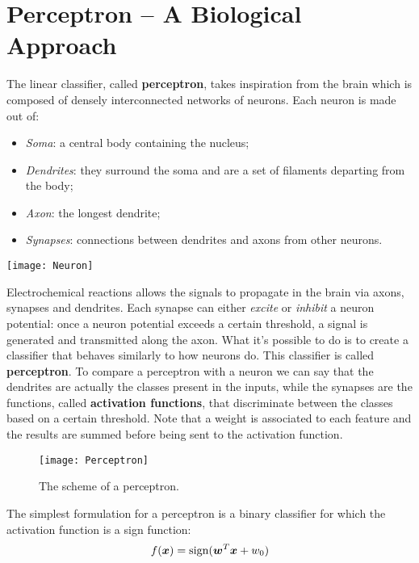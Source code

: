 \section{Perceptron -- A Biological Approach}
The linear classifier, called \textbf{perceptron}, takes inspiration from the brain which is composed of densely interconnected networks of neurons. \newline
Each neuron is made out of:
\begin{itemize}
  \item \textit{Soma}: a central body containing the nucleus;
  \item \textit{Dendrites}: they surround the soma and are a set of filaments departing from the body;
  \item \textit{Axon}: the longest dendrite;
  \item \textit{Synapses}: connections between dendrites and axons from other neurons. 
\end{itemize}
\begin{center}
  \texttt{[image: Neuron]}
\end{center}
Electrochemical reactions allows the signals to propagate in the brain via axons, synapses and dendrites. \newline
Each synapse can either \textit{excite} or \textit{inhibit} a neuron potential: once a neuron potential exceeds a certain threshold, a signal is generated and transmitted along the axon. \newline
What it's possible to do is to create a classifier that behaves similarly to how neurons do. This classifier is called \textbf{perceptron}. \newline
To compare a perceptron with a neuron we can say that the dendrites are actually the classes present in the inputs, while the synapses are the functions, called \textbf{activation functions}, that discriminate between the classes based on a certain threshold. \newline
Note that a weight is associated to each feature and the results are summed before being sent to the activation function.  
\begin{figure}
  \centering
  \texttt{[image: Perceptron]}
  \caption{The scheme of a perceptron.}
  \label{fig:Perceptron}
\end{figure}
The simplest formulation for a perceptron is a binary classifier for which the activation function is a sign function:
\begin{equation}
  f(\bm{x})=\text{sign}(\bm{w}^T\bm{x}+w_0)
  \label{eq:BinaryPerceptron}
\end{equation}
